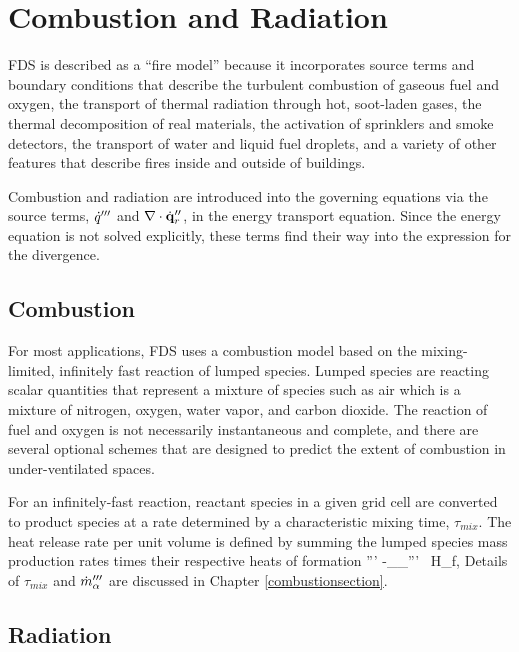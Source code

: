 \section{Combustion and Radiation}

FDS is described as a ``fire model'' because it incorporates source terms and boundary conditions that describe the
turbulent combustion of gaseous fuel and oxygen, the transport of thermal radiation through hot, soot-laden gases, the
thermal decomposition of real materials, the activation of sprinklers and smoke detectors, the transport of water and liquid fuel
droplets, and a variety of other features that describe fires inside and outside of buildings.

Combustion and radiation are introduced into the governing equations via the source terms, $\dot{q}'''$ and $\nabla \cdot \dot{\bf q}_r''$,
in the energy transport equation. Since the energy equation is not solved explicitly, these terms find their way into the
expression for the divergence.

\subsection{Combustion}

For most applications, FDS uses a combustion model based on the mixing-limited, infinitely fast reaction of lumped species.
Lumped species are reacting scalar quantities that represent a mixture of species such as air which is a mixture of
nitrogen, oxygen, water vapor, and carbon dioxide.  The reaction of fuel and oxygen is not necessarily instantaneous and
complete, and there are
several optional schemes that are designed to predict the extent of combustion in under-ventilated spaces.

For an infinitely-fast reaction, reactant species in a given grid cell are converted to product species at a rate determined by a
characteristic mixing time, $\tau_{mix}$. The heat release rate per unit volume is defined by summing the lumped species mass production rates times their respective heats of formation
\be
   \dq''' \equiv -\sum_\alpha \dm_\alpha''' \, \Delta H_{f,\alpha} \label{EDC1}
\ee  %
Details of $\tau_{mix}$ and $\dot{m}_\alpha'''$ are discussed in Chapter \ref{combustionsection}.

\subsection{Radiation}

